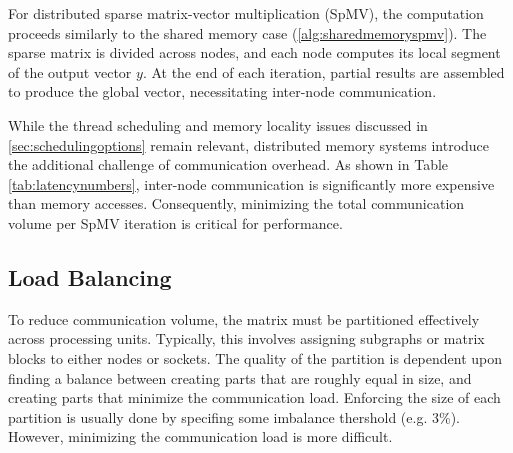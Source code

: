 For distributed sparse matrix-vector multiplication (SpMV), the computation proceeds similarly to the shared memory case (\autoref{alg:sharedmemoryspmv}). The sparse matrix is divided across nodes, and each node computes its local segment of the output vector \(y\). At the end of each iteration, partial results are assembled to produce the global vector, necessitating inter-node communication.

\medskip

While the thread scheduling and memory locality issues discussed in \ref{sec:schedulingoptions} remain relevant, distributed memory systems introduce the additional challenge of communication overhead. As shown in Table \ref{tab:latencynumbers}, inter-node communication is significantly more expensive than memory accesses. Consequently, minimizing the total communication volume per SpMV iteration is critical for performance.







\subsection{Load Balancing}
To reduce communication volume, the matrix must be partitioned effectively across processing units. Typically, this involves assigning subgraphs or matrix blocks to either nodes or sockets. The quality of the partition is dependent upon finding a balance between creating parts that are roughly equal in size, and creating parts that minimize the communication load. Enforcing the size of each partition is usually done by specifing some imbalance thershold (e.g. 3\%). However, minimizing the communication load is more difficult. 
\medskip

